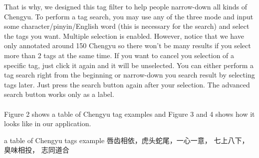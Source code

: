 \documentclass[11pt]{article} %
\begin{document}
That is why, we designed this tag filter to help people narrow-down all kinds of Chengyu. To perform a tag search, you may use any of the three mode and input some character/pinyin/English word (this is necessary for the search) and select the tags you want. Multiple selection is enabled. However, notice that we have only annotated around 150 Chengyu so there won't be many results if you select more than 2 tags at the same time. If you want to cancel you selection of a specific tag, just click it again and it will be unselected. You can either perform a tag search right from the beginning or narrow-down you search result by selecting tags later. Just press the search button again after your selection. The advanced search button works only as a label. \\
\\
Figure 2 shows a table of Chengyu tag examples and Figure 3 and 4 shows how it looks like in our application. 

\indent a table of Chengyu tags example 唇齿相依，虎头蛇尾，一心一意， 七上八下， 臭味相投， 志同道合

\begin{table}[h]
\caption{Chengyu-Tags Examples}
\end{table}
\end{document}
